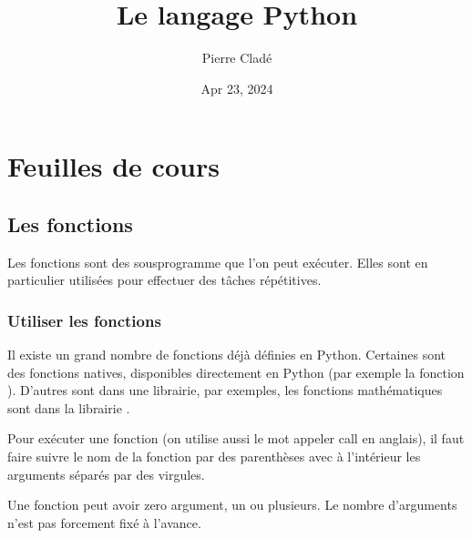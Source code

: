 \documentclass[letterpaper,10pt,english]{sphinxhowto}
\title{Le langage Python}
\date{Apr 23, 2024}
\author{Pierre Cladé}
\begin{document}
\pagestyle{empty}
\sphinxmaketitle
\pagestyle{plain}

\pagestyle{normal}
\label{\detokenize{index::doc}}



\section{Feuilles de cours}
\label{\detokenize{feuilles_de_cours:feuilles-de-cours}}\label{\detokenize{feuilles_de_cours::doc}}

\subsection{Les fonctions}
\label{\detokenize{cours1_fonctions_cours:les-fonctions}}\label{\detokenize{cours1_fonctions_cours::doc}}
\sphinxAtStartPar
Les fonctions sont des sous\sphinxhyphen{}programme que l’on peut exécuter. Elles sont en particulier utilisées pour effectuer des tâches répétitives.


\subsubsection{Utiliser les fonctions}
\label{\detokenize{cours1_fonctions_cours:utiliser-les-fonctions}}
\sphinxAtStartPar
Il existe un grand nombre de fonctions déjà définies en Python. Certaines sont des fonctions natives, disponibles directement en Python (par exemple la fonction ). D’autres sont dans une librairie, par exemples, les fonctions mathématiques sont dans la librairie .

\sphinxAtStartPar
Pour exécuter une fonction (on utilise aussi le mot appeler \sphinxhyphen{} call en anglais), il faut faire suivre le nom de la fonction par des parenthèses avec à l’intérieur les arguments séparés par des virgules.

\sphinxAtStartPar
Une fonction peut avoir zero argument, un ou plusieurs. Le nombre d’arguments n’est pas forcement fixé à l’avance.

\begin{sphinxVerbatim}[commandchars=\\\{\}]
 

    
 

  
\end{sphinxVerbatim}
\end{document}
